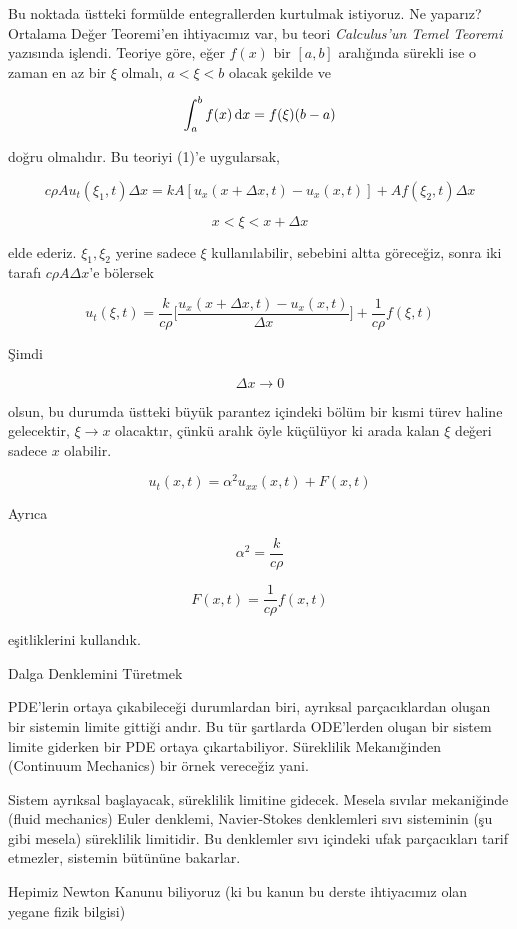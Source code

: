 \documentclass[12pt,fleqn]{article}\usepackage{../../common}
\begin{document}
Bu noktada üstteki formülde entegrallerden kurtulmak istiyoruz. Ne
yaparız?  Ortalama Değer Teoremi'en ihtiyacımız var, bu teori {\em
  Calculus'un Temel Teoremi} yazısında işlendi. Teoriye göre, eğer $f(x)$
bir $[a,b]$ aralığında sürekli ise o zaman en az bir $\xi$ olmalı, $a <
\xi < b$ olacak şekilde ve

$$ \int _{ a}^{b} f(x) \,\mathrm{d} x = f(\xi)(b-a)  $$

doğru olmalıdır. Bu teoriyi (1)'e uygularsak,

$$ c\rho A u_t(\xi_1,t)\Delta x = 
kA[u_x(x+\Delta x, t) - u_x(x,t)] + 
Af(\xi_2,t)\Delta x
 $$

$$ x < \xi < x+\Delta x $$

elde ederiz. $\xi_1,\xi_2$ yerine sadece $\xi$ kullanılabilir, sebebini
altta göreceğiz, sonra iki tarafı $c\rho A \Delta x$'e bölersek


$$
u_t(\xi,t) =  \frac{k}{c\rho}
\bigg[
\frac{u_x(x+\Delta x,t) - u_x(x,t)} {\Delta x}
\bigg]
+ \frac{ 1}{c\rho}f(\xi,t)
$$

Şimdi 

$$ \Delta x \to 0 $$

olsun, bu durumda üstteki büyük parantez içindeki bölüm bir kısmi türev
haline gelecektir, $\xi \to x$ olacaktır, çünkü aralık öyle küçülüyor ki
arada kalan $\xi$ değeri sadece $x$ olabilir.

$$ u_t(x,t) = \alpha^2u_{xx}(x,t) + F(x,t) $$

Ayrıca

$$ \alpha^2 = \frac{k}{c\rho} $$

$$ F(x,t) = \frac{1}{c\rho}f(x,t) $$

eşitliklerini kullandık. 

Dalga Denklemini Türetmek 

PDE'lerin ortaya çıkabileceği durumlardan biri, ayrıksal parçacıklardan oluşan
bir sistemin limite gittiği andır. Bu tür şartlarda ODE'lerden oluşan bir sistem
limite giderken bir PDE ortaya çıkartabiliyor. Süreklilik Mekanığinden
(Continuum Mechanics) bir örnek vereceğiz yani.

Sistem ayrıksal başlayacak, süreklilik limitine gidecek. Mesela sıvılar
mekaniğinde (fluid mechanics) Euler denklemi, Navier-Stokes denklemleri sıvı
sisteminin (şu gibi mesela) süreklilik limitidir. Bu denklemler sıvı içindeki
ufak parçacıkları tarif etmezler, sistemin bütününe bakarlar.

Hepimiz Newton Kanunu biliyoruz (ki bu kanun bu derste ihtiyacımız olan
yegane fizik bilgisi)
\end{document}
